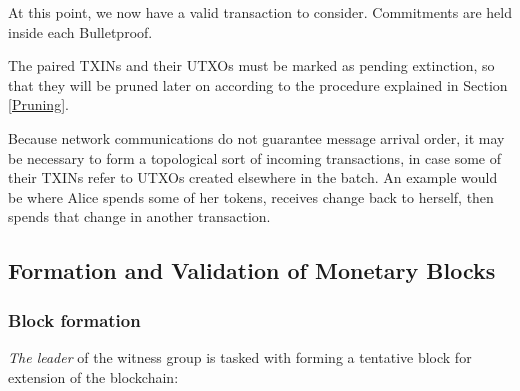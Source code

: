 \documentclass[a4paper, 10pt, conference]{ieeeconf}
\begin{document}
At this point, we now have a valid transaction to consider. Commitments are held inside each Bulletproof.

The paired TXINs and their UTXOs must be marked as pending extinction, so that they will be pruned later on according to the procedure explained in Section \ref{Pruning}.

Because network communications do not guarantee message arrival order, it may be necessary to form a topological sort of incoming transactions, in case some of their TXINs refer to UTXOs created elsewhere in the batch. An example would be where Alice spends some of her tokens, receives change back to herself, then spends that change in another transaction.

\subsection{Formation and Validation of Monetary Blocks}\label{Block}

\subsubsection{Block formation} \textit{The leader} of the witness group is tasked with forming a tentative block for extension of the blockchain:
\end{document}
